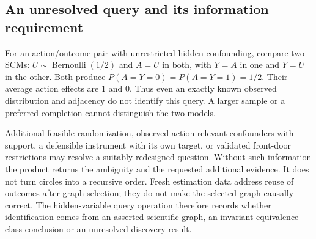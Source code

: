 \subsection{An unresolved query and its information requirement}
For an action/outcome pair with unrestricted hidden confounding, compare
two SCMs: $U\sim\operatorname{Bernoulli}(1/2)$ and $A=U$ in both,
with $Y=A$ in one and $Y=U$ in the other. Both produce
$P(A=Y=0)=P(A=Y=1)=1/2$. Their average action effects are 1 and 0.
Thus even an exactly known observed distribution and adjacency do not
identify this query. A larger sample or a preferred completion cannot
distinguish the two models.

Additional feasible randomization, observed action-relevant confounders
with support, a defensible instrument with its own target, or validated
front-door restrictions may resolve a suitably redesigned question. Without
such information the product returns the ambiguity and the requested
additional evidence. It does not turn circles into a recursive order.
Fresh estimation data address reuse of outcomes after graph selection;
they do not make the selected graph causally correct. The hidden-variable
query operation therefore records whether identification comes from an
asserted scientific graph, an invariant equivalence-class conclusion or
an unresolved discovery result.
